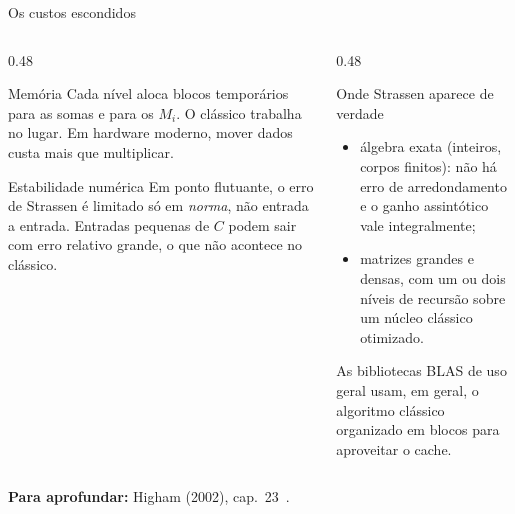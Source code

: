 \documentclass[aspectratio=169,xcolor=table]{beamer}
\newcommand{\fonte}[1]{%
  \vfill
  {\tiny\color{gray!55!black}\textbf{Para aprofundar:} #1\par}%
}
\begin{document}
\begin{frame}{Os custos escondidos}
  \begin{columns}[T]
    \begin{column}{0.48\textwidth}
      \begin{block}{Memória}
        \scriptsize Cada nível aloca blocos temporários para as somas e para os $M_i$.
        O clássico trabalha no lugar. Em hardware moderno, mover dados custa mais que
        multiplicar.
      \end{block}
      \begin{block}{Estabilidade numérica}
        \scriptsize Em ponto flutuante, o erro de Strassen é limitado só em \emph{norma},
        não entrada a entrada. Entradas pequenas de $C$ podem sair com erro relativo
        grande, o que não acontece no clássico.
      \end{block}
    \end{column}
    \begin{column}{0.48\textwidth}
      \begin{exampleblock}{Onde Strassen aparece de verdade}
        \scriptsize
        \begin{itemize}\scriptsize
          \item álgebra exata (inteiros, corpos finitos): não há erro de arredondamento e
                o ganho assintótico vale integralmente;
          \item matrizes grandes e densas, com um ou dois níveis de recursão sobre
                um núcleo clássico otimizado.
        \end{itemize}
      \end{exampleblock}
      \scriptsize As bibliotecas BLAS de uso geral usam, em geral, o algoritmo clássico
      organizado em blocos para aproveitar o cache.
    \end{column}
  \end{columns}
  \fonte{Higham (2002), cap.~23~\cite{higham2002accuracy}.}
\end{frame}
\end{document}
